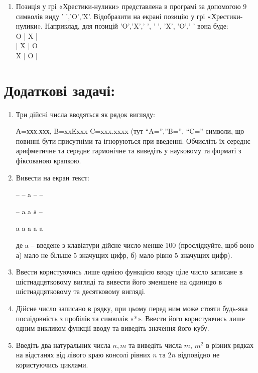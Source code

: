 \documentclass[a5paper,titlepage,openany,twoside,draft]{book_unv}%
\begin{document}
\begin{enumerate}
\item
Позиція у  грі «Хрестики-нулики» представлена в програмі за допомогою 9 символів виду ' ','O','X'. 
Відобразити на екрані позицію у грі «Хрестики-нулики». 
Наприклад, для позицій 'O','X',' ', ' ', 'X', 'O',' ' вона буде:\\
O | X | \hspace*{7pt}  \\   
\hspace*{7pt} | X | O \\
X | O | \hspace*{7pt}  \\ 



\end{enumerate}

\section{Додаткові задачі:}

\begin{enumerate}
\def\labelenumi{\arabic{enumi}.}
\setcounter{enumi}{19}
\item
  Три дійсні числа вводяться як рядок вигляду:

А=ххх.ххх, B=xxExxx C=xxx.xxxx (тут ``A='',''B='', ``C='' символи, що
повинні бути присутніми та ігноруються при введенні. Обчисліть їх
середнє арифметичне та середнє гармонічне та виведіть у науковому та
форматі з фіксованою крапкою.

\item
  Вивести на екран текст:

-- \textbar{} -- \textbar{} a \textbar{} -- \textbar{} --

-- \textbar{} a \textbar{} a \textbar{} а \textbar{} --

a \textbar{} a \textbar{} a \textbar{} a \textbar{} a

де a -- введене з клавіатури дійсне число менше 100 (прослідкуйте, щоб
воно а) мало не більше 5 значущих цифр, б) мало рівно 5 значущих цифр).

\item
Ввести користуючись лише однією функцією вводу ціле число записане в шістнадцятковому вигляді та вивести його зменшене на одиницю в  шістнадцятковому та десятковому вигляді.

\item
Дійсне число записано в рядку, при цьому перед ним може стояти будь-яка послідовність з пробілів та символів «*». Ввести його  користуючись лише одним викликом функції вводу та виведіть значення його кубу.

\item
Введіть два натуральних числа $n, m$ та виведіть числа $m$, $m^{2}$ в різних рядках
 на відстанях від лівого краю консолі рівних $n$ та $2n$ відповідно не користуючись циклами.

\end{enumerate}
\end{document}

